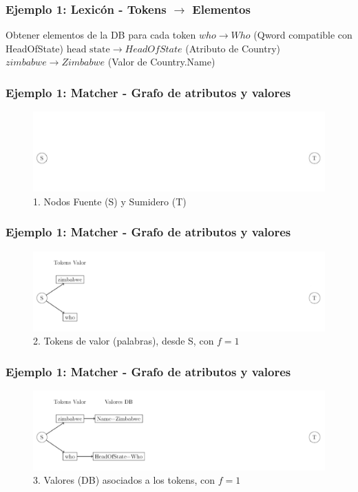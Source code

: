\begin{frame}[t]
\frametitle{Ejemplo 1: Lexicón - Tokens $\rightarrow$ Elementos}
Obtener elementos de la DB para cada token\newline
  \Large{
    $who \rightarrow Who$ (Qword compatible con HeadOfState) \newline
    $\text{head state} \rightarrow HeadOfState$ (Atributo de Country) \newline
    $zimbabwe \rightarrow Zimbabwe$ (Valor de Country.Name)\newline
    }
\end{frame}

\begin{frame}
\frametitle{Ejemplo 1: Matcher - Grafo de atributos y valores}
\begin{figure}
  \centering
    \includegraphics[scale=.33]{graficos/presentacion/ejemplo-grafo-matcher-1-2}
    \caption{1. Nodos Fuente (S) y Sumidero (T)}
\end{figure}

\end{frame}

\begin{frame}
\frametitle{Ejemplo 1: Matcher - Grafo de atributos y valores}
\begin{figure}
  \centering
    \includegraphics[scale=.33]{graficos/presentacion/ejemplo-grafo-matcher-1-3}
    \caption{2. Tokens de valor (palabras), desde S, con $f=1$}
\end{figure}
\end{frame}

\begin{frame}
\frametitle{Ejemplo 1: Matcher - Grafo de atributos y valores}
\begin{figure}
  \centering
    \includegraphics[scale=.33]{graficos/presentacion/ejemplo-grafo-matcher-1-4}
    \caption{3. Valores (DB) asociados a los tokens, con $f=1$}
\end{figure}
\end{frame}

